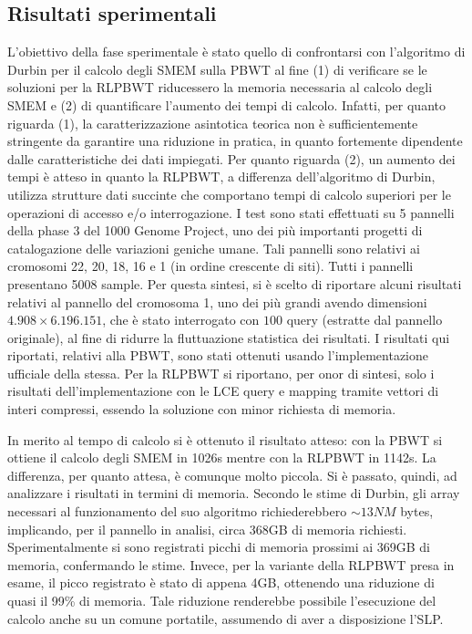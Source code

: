 \documentclass[a4paper,11pt, oneside,italian]{article}
\begin{document}
\subsection*{Risultati sperimentali}
L'obiettivo della fase sperimentale è stato quello di confrontarsi con
l'algoritmo di Durbin per il calcolo degli SMEM sulla PBWT al fine 
(1) di verificare se le soluzioni per la RLPBWT riducessero la memoria
necessaria al calcolo degli 
SMEM e (2) di quantificare l'aumento dei tempi di calcolo.
Infatti, per quanto riguarda (1), la caratterizzazione asintotica teorica non è
sufficientemente stringente da garantire una riduzione in pratica, in quanto
fortemente dipendente dalle caratteristiche dei dati impiegati.
Per quanto riguarda (2), un aumento dei tempi è atteso in quanto la RLPBWT,
a differenza dell'algoritmo di Durbin, utilizza strutture dati succinte che
comportano tempi di calcolo superiori per le operazioni di accesso e/o
interrogazione. 
I test sono stati effettuati su 5 pannelli della phase 3 del 1000 Genome
Project, uno dei più importanti progetti di catalogazione delle variazioni
geniche 
umane. Tali pannelli sono relativi ai cromosomi 22, 20, 18, 16 e 1
(in ordine crescente di siti). Tutti i pannelli presentano 5008 sample.
Per questa sintesi, si è scelto di riportare alcuni risultati relativi al
pannello del cromosoma 1, uno dei più grandi avendo dimensioni $4.908 \times
6.196.151$, che è stato 
interrogato con $100$ query (estratte dal pannello originale), al 
fine di ridurre la fluttuazione statistica dei risultati.
I risultati qui riportati, relativi alla PBWT, sono stati ottenuti usando
l'implementazione ufficiale della stessa. Per la RLPBWT si riportano, per onor
di sintesi, solo i
risultati dell'implementazione con le LCE query e mapping tramite vettori di
interi compressi, essendo la soluzione con minor richiesta di memoria. 

In merito al tempo di calcolo si è ottenuto il risultato atteso: con
la PBWT si ottiene il calcolo degli SMEM in 1026s
mentre con la RLPBWT in 1142s. La differenza, per quanto attesa, è comunque
molto piccola.
Si è passato, quindi, ad analizzare i risultati in termini di memoria. Secondo
le stime di Durbin, gli array necessari al funzionamento del suo algoritmo
richiederebbero $\sim13NM$ bytes, implicando, per il pannello in analisi, circa
368GB di memoria richiesti. 
Sperimentalmente si sono registrati
picchi di memoria prossimi ai 369GB di memoria, confermando le stime. Invece,
per la variante della RLPBWT presa in esame, il picco
registrato è stato di appena 4GB, 
ottenendo una riduzione di quasi il 99\% di memoria. Tale riduzione renderebbe
possibile l'esecuzione del calcolo anche su un comune portatile, assumendo di
aver a disposizione l'SLP. 
\end{document}
